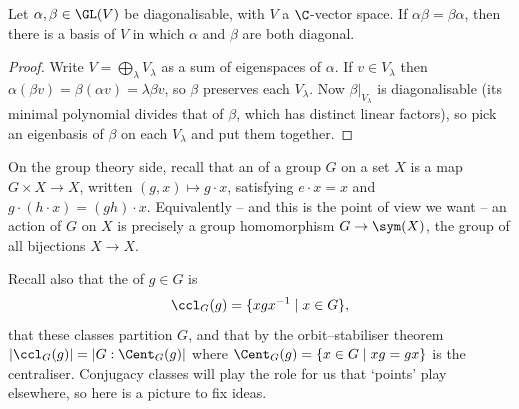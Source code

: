 \begin{proposition}
	Let $\alpha, \beta \in \GL(V)$ be diagonalisable, with $V$ a $\C$-vector space. If $\alpha\beta = \beta\alpha$, then there is a basis of $V$ in which $\alpha$ and $\beta$ are both diagonal.
\end{proposition}
\begin{proof}
	Write $V = \bigoplus_{\lambda} V_\lambda$ as a sum of eigenspaces of $\alpha$. If $v \in V_\lambda$ then $\alpha(\beta v) = \beta(\alpha v) = \lambda \beta v$, so $\beta$ preserves each $V_\lambda$. Now $\beta|_{V_\lambda}$ is diagonalisable (its minimal polynomial divides that of $\beta$, which has distinct linear factors), so pick an eigenbasis of $\beta$ on each $V_\lambda$ and put them together.
\end{proof}

On the group theory side, recall that an  of a group $G$ on a set $X$ is a map $G \times X \to X$, written $(g, x) \mapsto g \cdot x$, satisfying $e \cdot x = x$ and $g\cdot(h \cdot x) = (gh)\cdot x$. Equivalently -- and this is the point of view we want -- an action of $G$ on $X$ is precisely a group homomorphism $G \to \sym(X)$, the group of all bijections $X \to X$.

Recall also that the  of $g \in G$ is
$$\ccl_G(g) = \{ x g x^{-1} \mid x \in G \},$$
that these classes partition $G$, and that by the orbit--stabiliser theorem $|\ccl_G(g)| = |G : \Cent_G(g)|$ where $\Cent_G(g) = \{x \in G \mid xg = gx\}$ is the centraliser. Conjugacy classes will play the role for us that `points' play elsewhere, so here is a picture to fix ideas.

\begin{center}
\end{center}

